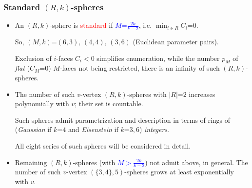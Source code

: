 \documentclass{beamer}
\begin{document}
\begin{frame}\frametitle{Standard $(R,k)$-spheres}

\begin{itemize}

\item An $(R,k)$-sphere is \textcolor{red}{standard} 
if \textcolor{blue}{$M$=$\frac{2k}{k-2}$}, i.e. $\min_{i\in R}C_i$=$0$.  

So, 
$(M,k)$=$(6,3),\,(4,4),\,(3,6)$ (Euclidean parameter pairs).

Exclusion
of
$i$-faces $C_i$$<$$0$ simplifies enumeration, while
 the number $p_M$
of {\em flat} ($C_M$=$0$) $M$-faces not being
restricted, there is an infinity of such $(R,k)$-spheres.
 

\item The number of such $v$-vertex $(R,k)$-spheres with 
$|R|$=$2$ increases polynomially with $v$; their set is countable.

Such spheres admit parametrization and description in terms of 
rings of ({\em Gaussian}
if $k$=$4$ and {\em Eisenstein} if $k$=$3,6$) {\em integers}.

All eight series of such spheres will be considered in detail.

\item Remaining $(R,k)$-spheres (with 
\textcolor{blue}{$M$$>$$\frac{2k}{k-2}$}) not 
admit above, in 
general. 
The number of such $v$-vertex  $(\{3,4\},5)$-spheres  
grows 
at least exponentially with $v$.
 

\end{itemize}\end{frame}
\end{document}
